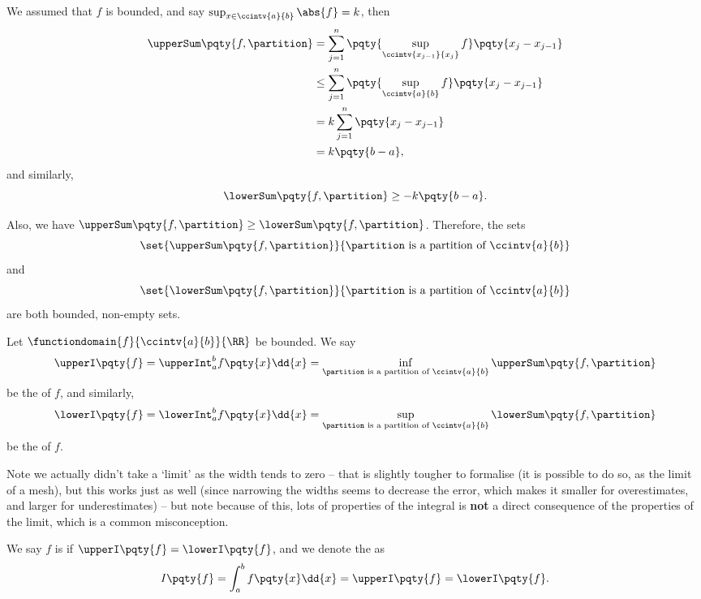 We assumed that \(f\) is bounded, and say \(\sup_{x \in \ccintv{a}{b}} \abs{f} = k\), then
\begin{align*}
    \upperSum\pqty{f, \partition} &= \sum_{j = 1}^{n} \pqty{\sup_{\ccintv{x_{j - 1}}{x_j}} f} \pqty{x_j - x_{j - 1}} \\
    &\leq \sum_{j = 1}^{n} \pqty{\sup_{\ccintv{a}{b}} f} \pqty{x_j - x_{j - 1}} \\
    &= k \sum_{j = 1}^{n} \pqty{x_j - x_{j - 1}} \\
    &= k \pqty{b - a},
\end{align*}
and similarly,
\[
    \lowerSum\pqty{f, \partition} \geq -k \pqty{b - a}.
\]

Also, we have \(\upperSum\pqty{f, \partition} \geq \lowerSum\pqty{f, \partition}\). Therefore, the sets
\[
    \set{\upperSum\pqty{f, \partition}}{\partition \text{ is a partition of }\ccintv{a}{b}}
\]
and
\[
    \set{\lowerSum\pqty{f, \partition}}{\partition \text{ is a partition of }\ccintv{a}{b}}
\]
are both bounded, non-empty sets.

\begin{definition}
    \label{def:upper-lower-int}%
    Let \(\functiondomain{f}{\ccintv{a}{b}}{\RR}\) be bounded. We say
    \[
        \upperI \pqty{f} = \upperInt_{a}^{b} f \pqty{x} \dd{x} = \inf_{\partition\text{ is a partition of }\ccintv{a}{b}} \upperSum \pqty{f, \partition}
    \]
    be the  of \(f\), and similarly,
    \[
        \lowerI \pqty{f} = \lowerInt_{a}^{b} f \pqty{x} \dd{x} = \sup_{\partition\text{ is a partition of }\ccintv{a}{b}} \lowerSum \pqty{f, \partition}
    \]
    be the  of \(f\).
\end{definition}

Note we actually didn't take a `limit' as the width tends to zero -- that is slightly tougher to formalise (it is possible to do so, as the limit of a mesh), but this works just as well (since narrowing the widths seems to decrease the error, which makes it smaller for overestimates, and larger for underestimates) -- but note because of this, lots of properties of the integral is \textbf{not} a direct consequence of the properties of the limit, which is a common misconception.

\begin{definition}
    \label{def:riemann-integral}%
    We say \(f\) is  if \(\upperI \pqty{f} = \lowerI \pqty{f}\), and we denote the  as
    \[
        I\pqty{f} = \int_{a}^{b} f\pqty{x} \dd{x} = \upperI\pqty{f} = \lowerI\pqty{f}.
    \]
\end{definition}


